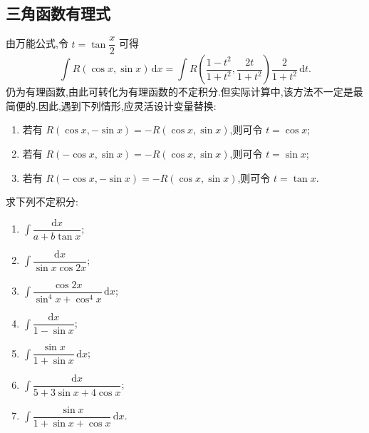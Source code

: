 \subsection{三角函数有理式}

\begin{proposition}[\markstar]
    由万能公式,令 $t=\tan\dfrac{x}{2}$ 可得
    \[
        \int R(\cos x,\sin x)\,\mathrm{d}x
        =\int R\left(\dfrac{1-t^2}{1+t^2},\dfrac{2t}{1+t^2}\right)
        \dfrac{2}{1+t^2}\,\mathrm{d}t.
    \]
    仍为有理函数,由此可转化为有理函数的不定积分.但实际计算中,该方法不一定是最简便的.因此,遇到下列情形,应灵活设计变量替换:
    \begin{enumerate}
        \item 若有 $R(\cos x,-\sin x)=-R(\cos x,\sin x)$,则可令 $t=\cos x$;
        \item 若有 $R(-\cos x,\sin x)=-R(\cos x,\sin x)$,则可令 $t=\sin x$;
        \item 若有 $R(-\cos x,-\sin x)=-R(\cos x,\sin x)$,则可令 $t=\tan x$.
    \end{enumerate}
\end{proposition}

\begin{example}
    求下列不定积分:
    \begin{enumerate}
        \item $\displaystyle\int\dfrac{\mathrm{d}x}{a+b\tan x}$;
        \item $\displaystyle\int\dfrac{\mathrm{d}x}{\sin x\cos2x}$;
        \item $\displaystyle\int\dfrac{\cos2x}{\sin^4x+\cos^4x}\,\mathrm{d}x$;
        \item $\displaystyle\int\dfrac{\mathrm{d}x}{1-\sin x}$;
        \item $\displaystyle\int\dfrac{\sin x}{1+\sin x}\,\mathrm{d}x$;
        \item $\displaystyle\int\dfrac{\mathrm{d}x}{5+3\sin x+4\cos x}$;
        \item $\displaystyle\int\dfrac{\sin x}{1+\sin x+\cos x}\,\mathrm{d}x$.
    \end{enumerate}
\end{example}
\exampleblank

